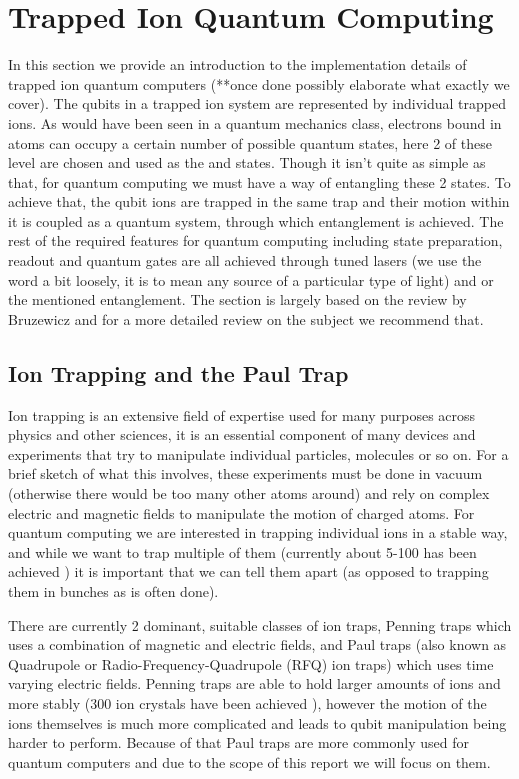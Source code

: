 
\section{Trapped Ion Quantum Computing} \label{sec:Trapped}
In this section we provide an introduction to the implementation details of trapped ion quantum computers (**once done possibly elaborate what exactly we cover).
The qubits in a trapped ion system are represented by individual trapped ions.
As would have been seen in a quantum mechanics class, electrons bound in atoms can occupy a certain number of possible quantum states, here 2 of these level are chosen and used as the \kz and \ko states.
Though it isn't quite as simple as that, for quantum computing we must have a way of entangling these 2 states.
To achieve that, the qubit ions are trapped in the same trap and their motion within it is coupled as a quantum system, through which entanglement is achieved.
The rest of the required features for quantum computing including state preparation, readout and quantum gates are all achieved through tuned lasers (we use the word a bit loosely, it is to mean any source of a particular type of light) and or the mentioned entanglement.
The section is largely based on the review by Bruzewicz \cite{bruzewiczTrappedionQuantumComputing2019} and for a more detailed review on the subject we recommend that.

\subsection{Ion Trapping and the Paul Trap}
Ion trapping is an extensive field of expertise used for many purposes across physics and other sciences, it is an essential component of many devices and experiments that try to manipulate individual particles, molecules or so on.
For a brief sketch of what this involves, these experiments must be done in vacuum (otherwise there would be too many other atoms around) and rely on complex electric and magnetic fields to manipulate the motion of charged atoms.
For quantum computing we are interested in trapping individual ions in a stable way, and while we want to trap multiple of them (currently about 5-100 has been achieved \cite{paganoCryogenicTrappedionSystem2018}) it is important that we can tell them apart (as opposed to trapping them in bunches as is often done).

There are currently 2 dominant, suitable classes of ion traps, Penning traps which uses a combination of magnetic and electric fields, and Paul traps (also known as Quadrupole or Radio-Frequency-Quadrupole (RFQ) ion traps) which uses time varying electric fields.
Penning traps are able to hold larger amounts of ions and more stably (300 ion crystals have been achieved \cite{bohnetQuantumSpinDynamics2016}), however the motion of the ions themselves is much more complicated and leads to qubit manipulation being harder to perform.
Because of that Paul traps are more commonly used for quantum computers and due to the scope of this report we will focus on them.

